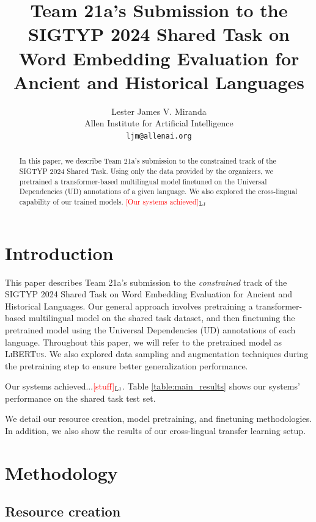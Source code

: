 \documentclass[11pt]{article}
\title{Team 21a's Submission to the SIGTYP 2024 Shared Task on Word Embedding Evaluation for Ancient and Historical Languages}
\author{Lester James V. Miranda \\
  Allen Institute for Artificial Intelligence \\
  \texttt{ljm@allenai.org} \\
}
\newcommand{\draftonly}[1]{#1}
\newcommand{\draftcomment}[3]{\draftonly{\textcolor{#2}{[#3]{$_{\textsc{#1}}$}}}}
\newcommand{\lj}[1]{\draftcomment{Lj}{red}{#1}}
\newcommand{\libertus}{\textsc{LiBERTus}}
\begin{document}
\maketitle

\begin{abstract}
In this paper, we describe Team 21a's submission to the constrained track of the SIGTYP 2024 Shared Task.
Using only the data provided by the organizers, we pretrained a transformer-based multilingual model finetuned on the Universal Dependencies (UD) annotations of a given language.
We also explored the cross-lingual capability of our trained models.
\lj{Our systems achieved}
\end{abstract}

\section{Introduction}
This paper describes Team 21a's submission to the \textit{constrained} track of the SIGTYP 2024 Shared Task on Word Embedding Evaluation for Ancient and Historical Languages.
Our general approach involves pretraining a transformer-based multilingual model on the shared task dataset, and then finetuning the pretrained model using the Universal Dependencies (UD) annotations of each language.
Throughout this paper, we will refer to the pretrained model as \libertus{}.
We also explored data sampling and augmentation techniques during the pretraining step to ensure better generalization performance.

Our systems achieved...\lj{stuff}. 
Table \ref{table:main_results} shows our systems' performance on the shared task test set.


We detail our resource creation, model pretraining, and finetuning methodologies.
In addition, we also show the results of our cross-lingual transfer learning setup.



\section{Methodology}

% 
% 


\subsection{Resource creation}
\end{document}
